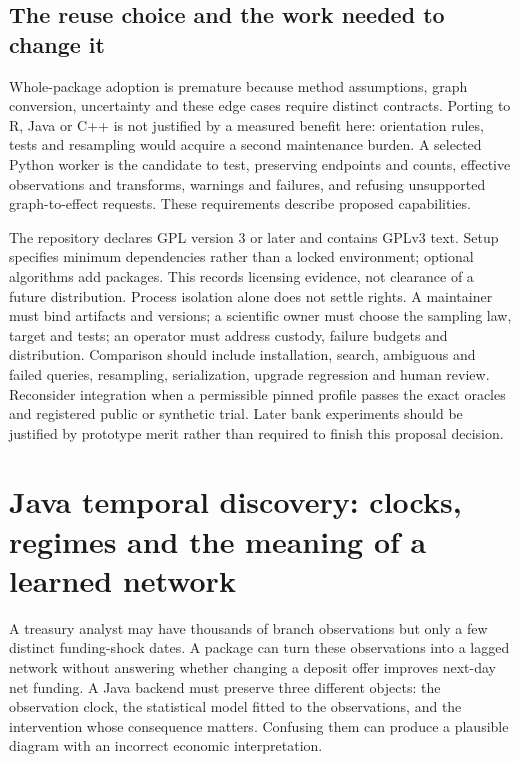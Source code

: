 \subsection{The reuse choice and the work needed to change it}
\label{exec23:tigramite-choice}
Whole-package adoption is premature because method assumptions, graph conversion, uncertainty and these edge cases require distinct contracts. Porting to R, Java or C++ is not justified by a measured benefit here: orientation rules, tests and resampling would acquire a second maintenance burden. A selected Python worker is the candidate to test, preserving endpoints and counts, effective observations and transforms, warnings and failures, and refusing unsupported graph-to-effect requests. These requirements describe proposed capabilities.

The repository declares GPL version 3 or later and contains GPLv3 text. Setup specifies minimum dependencies rather than a locked environment; optional algorithms add packages. This records licensing evidence, not clearance of a future distribution. Process isolation alone does not settle rights. A maintainer must bind artifacts and versions; a scientific owner must choose the sampling law, target and tests; an operator must address custody, failure budgets and distribution. Comparison should include installation, search, ambiguous and failed queries, resampling, serialization, upgrade regression and human review. Reconsider integration when a permissible pinned profile passes the exact oracles and registered public or synthetic trial. Later bank experiments should be justified by prototype merit rather than required to finish this proposal decision. \cite{exec23_tigramite_reuse_source,exec23_tigramite_reference}


\section{Java temporal discovery: clocks, regimes and the meaning of a learned network}
\label{exec15:java-temporal}

A treasury analyst may have thousands of branch observations but only a few
distinct funding-shock dates. A package can turn these observations into a
lagged network without answering whether changing a deposit offer improves
next-day net funding. A Java backend must preserve three different objects:
the observation clock, the statistical model fitted to the observations, and
the intervention whose consequence matters. Confusing them can produce a
plausible diagram with an incorrect economic interpretation.

